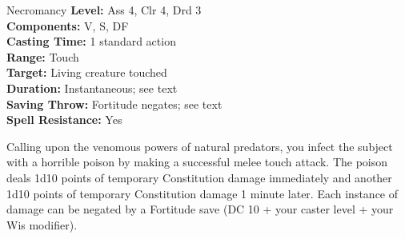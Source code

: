 {Necromancy}
{
	\textbf{Level:}
	Ass 4, Clr 4, Drd 3\\
	\textbf{Components:}
	V, S, DF\\
	\textbf{Casting Time:}
	1 standard action\\
	\textbf{Range:}
	Touch\\
	\textbf{Target:}
	Living creature touched\\
	\textbf{Duration:}
	Instantaneous; see text\\
	\textbf{Saving Throw:}
	Fortitude negates; see text\\
	\textbf{Spell Resistance:}
	Yes\\
}
{
	Calling upon the venomous powers of natural predators, you infect the subject with a horrible poison by making a successful melee touch attack. The poison deals 1d10 points of temporary Constitution damage immediately and another 1d10 points of temporary Constitution damage 1 minute later. Each instance of damage can be negated by a Fortitude save (DC 10 + \onehalf your caster level + your Wis modifier).

}
